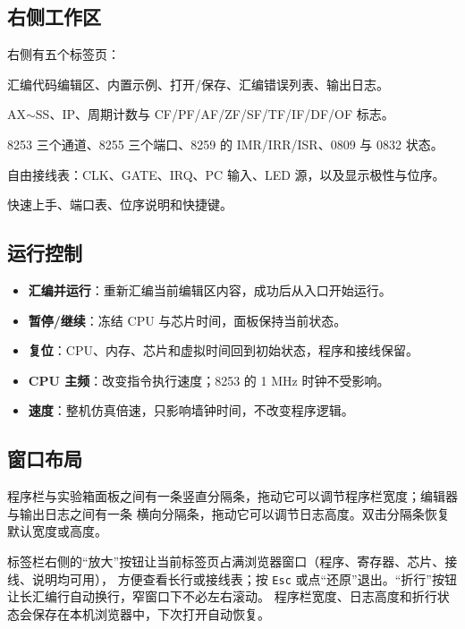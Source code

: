 \documentclass[11pt,a4paper]{ctexart}
\begin{document}
\subsection{右侧工作区}

右侧有五个标签页：

\begin{description}[leftmargin=2.2em]
  \item[程序] 汇编代码编辑区、内置示例、打开/保存、汇编错误列表、输出日志。
  \item[寄存器] AX$\sim$SS、IP、周期计数与 CF/PF/AF/ZF/SF/TF/IF/DF/OF 标志。
  \item[芯片] 8253 三个通道、8255 三个端口、8259 的 IMR/IRR/ISR、0809 与 0832 状态。
  \item[接线] 自由接线表：CLK、GATE、IRQ、PC 输入、LED 源，以及显示极性与位序。
  \item[说明] 快速上手、端口表、位序说明和快捷键。
\end{description}

\subsection{运行控制}

\begin{itemize}
  \item \textbf{汇编并运行}：重新汇编当前编辑区内容，成功后从入口开始运行。
  \item \textbf{暂停/继续}：冻结 CPU 与芯片时间，面板保持当前状态。
  \item \textbf{复位}：CPU、内存、芯片和虚拟时间回到初始状态，程序和接线保留。
  \item \textbf{CPU 主频}：改变指令执行速度；8253 的 1 MHz 时钟不受影响。
  \item \textbf{速度}：整机仿真倍速，只影响墙钟时间，不改变程序逻辑。
\end{itemize}

\subsection{窗口布局}

程序栏与实验箱面板之间有一条竖直分隔条，拖动它可以调节程序栏宽度；编辑器与输出日志之间有一条
横向分隔条，拖动它可以调节日志高度。双击分隔条恢复默认宽度或高度。

标签栏右侧的“放大”按钮让当前标签页占满浏览器窗口（程序、寄存器、芯片、接线、说明均可用），
方便查看长行或接线表；按 \texttt{Esc} 或点“还原”退出。“折行”按钮让长汇编行自动换行，窄窗口下不必左右滚动。
程序栏宽度、日志高度和折行状态会保存在本机浏览器中，下次打开自动恢复。
\end{document}
